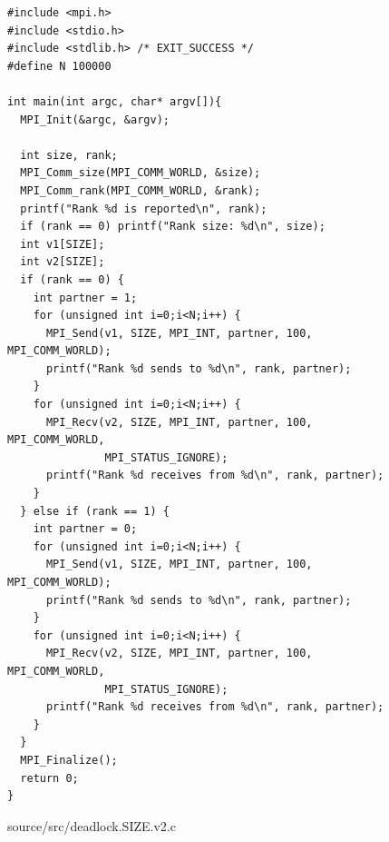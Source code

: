 \documentclass[12pt]{article}
\begin{document}
\newpage

\begin{figure}[h!]
	\begin{verbatim}
#include <mpi.h>
#include <stdio.h>
#include <stdlib.h> /* EXIT_SUCCESS */
#define N 100000

int main(int argc, char* argv[]){
  MPI_Init(&argc, &argv);

  int size, rank;
  MPI_Comm_size(MPI_COMM_WORLD, &size);
  MPI_Comm_rank(MPI_COMM_WORLD, &rank);
  printf("Rank %d is reported\n", rank);
  if (rank == 0) printf("Rank size: %d\n", size);
  int v1[SIZE];
  int v2[SIZE];
  if (rank == 0) {
    int partner = 1;
    for (unsigned int i=0;i<N;i++) {
      MPI_Send(v1, SIZE, MPI_INT, partner, 100, MPI_COMM_WORLD);
      printf("Rank %d sends to %d\n", rank, partner);
    }
    for (unsigned int i=0;i<N;i++) {
      MPI_Recv(v2, SIZE, MPI_INT, partner, 100, MPI_COMM_WORLD,
               MPI_STATUS_IGNORE);
      printf("Rank %d receives from %d\n", rank, partner);
    }
  } else if (rank == 1) {
    int partner = 0;
    for (unsigned int i=0;i<N;i++) {
      MPI_Send(v1, SIZE, MPI_INT, partner, 100, MPI_COMM_WORLD);
      printf("Rank %d sends to %d\n", rank, partner);
    }
    for (unsigned int i=0;i<N;i++) {
      MPI_Recv(v2, SIZE, MPI_INT, partner, 100, MPI_COMM_WORLD,
               MPI_STATUS_IGNORE);
      printf("Rank %d receives from %d\n", rank, partner);
    }
  }
  MPI_Finalize();
  return 0;
}
	\end{verbatim}
	\caption{source/src/deadlock.SIZE.v2.c}\label{code:deadlockSc}
\end{figure}

\newpage
\end{document}
